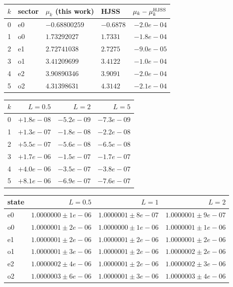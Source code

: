 \begin{tabular}{rlllr}\toprule $k$ & sector & $\mu_k$ (this work) & HJSS & $\mu_k-\mu_k^{\rm HJSS}$\\\midrule
0 & e0 & $-0.68800259$ & $-0.6878$ & $-2.0e-04$\\
1 & o0 & $1.73292027$ & $1.7331$ & $-1.8e-04$\\
2 & e1 & $2.72741038$ & $2.7275$ & $-9.0e-05$\\
3 & o1 & $3.41209699$ & $3.4122$ & $-1.0e-04$\\
4 & e2 & $3.90890346$ & $3.9091$ & $-2.0e-04$\\
5 & o2 & $4.31398631$ & $4.3142$ & $-2.1e-04$\\
\bottomrule\end{tabular}
\begin{tabular}{rrrr}\toprule $k$ & $L=0.5$ & $L=2$ & $L=5$\\\midrule
0 & $+1.8e-08$ & $-5.2e-09$ & $-7.3e-09$\\
1 & $+1.3e-07$ & $-1.8e-08$ & $-2.2e-08$\\
2 & $+5.5e-07$ & $-5.6e-08$ & $-6.5e-08$\\
3 & $+1.7e-06$ & $-1.5e-07$ & $-1.7e-07$\\
4 & $+4.0e-06$ & $-3.5e-07$ & $-3.8e-07$\\
5 & $+8.1e-06$ & $-6.9e-07$ & $-7.6e-07$\\
\bottomrule\end{tabular}
\begin{tabular}{lrrr}\toprule state & $L=0.5$ & $L=1$ & $L=2$\\\midrule
e0 & $1.0000000\pm1e-06$ & $1.0000001\pm8e-07$ & $1.0000001\pm9e-07$\\
o0 & $1.0000001\pm2e-06$ & $1.0000000\pm1e-06$ & $1.0000001\pm1e-06$\\
e1 & $1.0000001\pm2e-06$ & $1.0000001\pm2e-06$ & $1.0000001\pm2e-06$\\
o1 & $1.0000001\pm3e-06$ & $1.0000001\pm2e-06$ & $1.0000002\pm2e-06$\\
e2 & $1.0000002\pm4e-06$ & $1.0000001\pm2e-06$ & $1.0000002\pm3e-06$\\
o2 & $1.0000003\pm6e-06$ & $1.0000001\pm3e-06$ & $1.0000003\pm4e-06$\\
\bottomrule\end{tabular}
